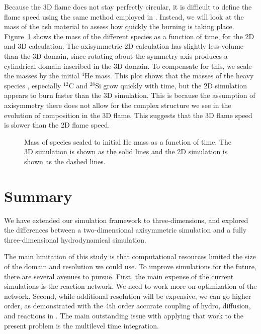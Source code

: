 \documentclass[twocolumn,times,tighten]{aastex631}
\newcommand{\isot}[2]{$^{#2}\mathrm{#1}$}
\begin{document}
Because the 3D flame does not stay perfectly circular, it is difficult
to define the flame speed using the same method employed in
\citet{eiden:2020}.  Instead, we will look at the mass of the ash
material to assess how quickly the burning is taking place.
Figure~\ref{fig:mass_plot} shows the mass of the different species as
a function of time, for the 2D and 3D calculation.  The axisymmetric
2D calculation has slightly less volume than the 3D domain, since
rotating about the symmetry axis produces a cylindrical domain
inscribed in the 3D domain.  To compensate for this, we scale the
masses by the initial \isot{He}{4} mass.  This plot shows that the
masses of the heavy species , especially \isot{C}{12} and
\isot{Si}{28} grow quickly with time, but the 2D simulation appears to
burn faster than the 3D simulation.  This is because the assumption of
axisymmetry there does not allow for the complex structure we see in
the evolution of composition in the 3D flame.  This suggests that the
3D flame speed is slower than the 2D flame speed.

\begin{figure}[t]
\centering
{}
\caption{\label{fig:mass_plot} Mass of species scaled to initial He mass as a function of time.  The 3D simulation is shown as the solid lines and the 2D simulation is shown as the dashed lines.}
\end{figure}

\section{Summary}

We have extended our simulation framework to three-dimensions, and
explored the differences between a two-dimensional axisymmetric
simulation and a fully three-dimensional hydrodynamical simulation.

The main limitation of this study is that computational resources
limited the size of the domain and resolution we could use.  To
improve simulations for the future, there are several avenues to
pursue.  First, the main expense of the current simulations is the
reaction network.  We need to work more on optimization of the
network.  Second, while additional resolution will be expensive, we
can go higher order, as demonstrated with the 4th order accurate
coupling of hydro, diffusion, and reactions in \cite{castro-sdc}.  The
main outstanding issue with applying that work to the present problem
is the multilevel time integration.
\end{document}
